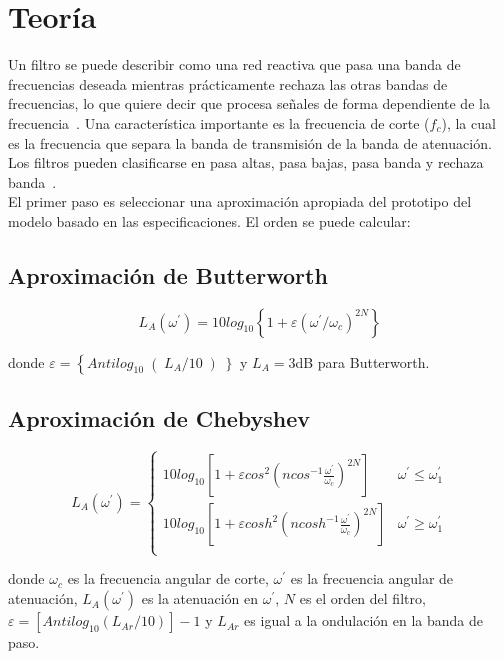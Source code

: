 \section{Teoría}
Un filtro se puede describir como una red reactiva que pasa una banda de frecuencias deseada mientras prácticamente rechaza las otras bandas de frecuencias, lo que quiere decir que procesa señales de forma dependiente de la frecuencia~\cite{zumbahlen2008581}. Una característica importante es la frecuencia de corte ($f_{c}$), la cual es la frecuencia que separa la banda de transmisión de la banda de atenuación. Los filtros pueden clasificarse en pasa altas, pasa bajas, pasa banda y rechaza banda~\cite{keysight_csc2}. \\

El primer paso es seleccionar una aproximación apropiada del prototipo del modelo basado en las especificaciones. El orden se puede calcular:

\subsection*{Aproximación de Butterworth}
\begin{equation}
    L_{A}(\omega^{'}) = 10 log_{10} \left\{1 + \varepsilon \left( \omega^{'} / \omega_{c} \right)^{2N} \right\}
\end{equation}

donde $\varepsilon = \left\{ Antilog_{10} \right( L_{A} / 10 \left) \right\}$ y $L_{A} = 3$dB para Butterworth.


\subsection*{Aproximación de Chebyshev}
\begin{equation}
    L_{A}(\omega^{'}) =
    \begin{cases}
        10 log_{10} \left[ 1 + \varepsilon cos^{2} \left( ncos^{-1} \frac{\omega^{'}}{\omega_{c}} \right)^{2N} \right] & \omega^{'} \leq \omega^{'}_{1} \\
        10 log_{10} \left[ 1 + \varepsilon cosh^{2} \left( ncosh^{-1} \frac{\omega^{'}}{\omega_{c}} \right)^{2N} \right] & \omega^{'} \geq \omega^{'}_{1} \\
    \end{cases}
\end{equation}

donde $\omega_{c}$ es la frecuencia angular de corte, $\omega^{'}$ es la frecuencia angular de atenuación, $L_{A}(\omega^{'})$ es la atenuación en $\omega^{'}$, $N$ es el orden del filtro, $\varepsilon = [Antilog_{10} ( L_{Ar} / 10)] - 1$ y $L_{Ar}$ es igual a la ondulación en la banda de paso. \\

